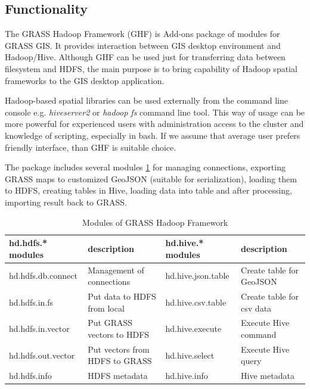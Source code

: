 \documentclass[a4paper,12pt,oneside]{report}
\begin{document}
	
	\subsection{Functionality}
    The GRASS Hadoop Framework (GHF) is Add-ons package of modules
    for GRASS GIS. It provides interaction between GIS desktop environment and
    Hadoop/Hive. Although GHF can be used just for transferring data between filesystem
    and HDFS, the main purpose is to bring capability of Hadoop spatial
    frameworks  to the GIS desktop application. 
    
    Hadoop-based spatial libraries can be used externally from the
    command line console e.g. \textit{hiveserver2} or \textit{hadoop fs}
    command line tool. This way of usage can be more powerful for experienced users with
    administration access to the cluster and knowledge of scripting, especially in bash.
    If we assume that average user prefers friendly interface, than GHF is suitable
    choice. 
    
    The package includes several modules \ref{tbl:modules} for managing connections,
    exporting GRASS maps to customized GeoJSON (suitable for serialization), loading
    them to HDFS, creating tables in Hive, loading data into table and after
    processing, importing result back to GRASS.

	\begin{table}[!htbp]
		\centering
		\begin{scriptsize}
			\begin{tabular}{@{}|l|l||l|l|@{}}
				\toprule
				hd.hdfs.* modules  & description                    & hd.hive.* modules  & description
				\\ \midrule \midrule
				hd.hdfs.db.connect & Management of connections      & hd.hive.json.table & Create
				table for GeoJSON  \\ \midrule
				hd.hdfs.in.fs      & Put data to HDFS from local       & hd.hive.csv.table  & Create
				table for csv data \\ \midrule
				hd.hdfs.in.vector  & Put GRASS vectors to HDFS      & hd.hive.execute    & Execute
				Hive command      \\ \midrule
				hd.hdfs.out.vector & Put vectors from HDFS to GRASS & hd.hive.select     & Execute
				Hive query        \\ \midrule
				hd.hdfs.info       & HDFS metadata                  & hd.hive.info       & Hive
				metadata             \\ \bottomrule
			\end{tabular}%
		\end{scriptsize}
		\caption{Modules of GRASS Hadoop Framework}
		\label{tbl:modules}
	\end{table}
	
\end{document}
